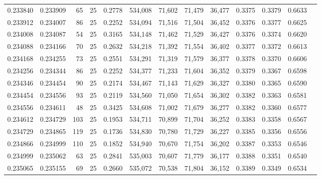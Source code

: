 \begin{tabular}{rrrrrrrrrrrrr}
0.233840 & 0.233909 &    65 &  25 &                                     0.2778 & 534,008 &  71,602 &  71,479 &  36,477 & 0.3375 & 0.3379 & 0.6633 \\
0.233912 & 0.234007 &    86 &  25 &                                     0.2252 & 534,094 &  71,516 &  71,504 &  36,452 & 0.3376 & 0.3377 & 0.6625 \\
0.234008 & 0.234087 &    54 &  25 &                                     0.3165 & 534,148 &  71,462 &  71,529 &  36,427 & 0.3376 & 0.3374 & 0.6620 \\
0.234088 & 0.234166 &    70 &  25 &                                     0.2632 & 534,218 &  71,392 &  71,554 &  36,402 & 0.3377 & 0.3372 & 0.6613 \\
0.234168 & 0.234255 &    73 &  25 &                                     0.2551 & 534,291 &  71,319 &  71,579 &  36,377 & 0.3378 & 0.3370 & 0.6606 \\
0.234256 & 0.234344 &    86 &  25 &                                     0.2252 & 534,377 &  71,233 &  71,604 &  36,352 & 0.3379 & 0.3367 & 0.6598 \\
0.234346 & 0.234454 &    90 &  25 &                                     0.2174 & 534,467 &  71,143 &  71,629 &  36,327 & 0.3380 & 0.3365 & 0.6590 \\
0.234454 & 0.234556 &    93 &  25 &                                     0.2119 & 534,560 &  71,050 &  71,654 &  36,302 & 0.3382 & 0.3363 & 0.6581 \\
0.234556 & 0.234611 &    48 &  25 &                                     0.3425 & 534,608 &  71,002 &  71,679 &  36,277 & 0.3382 & 0.3360 & 0.6577 \\
0.234612 & 0.234729 &   103 &  25 &                                     0.1953 & 534,711 &  70,899 &  71,704 &  36,252 & 0.3383 & 0.3358 & 0.6567 \\
0.234729 & 0.234865 &   119 &  25 &                                     0.1736 & 534,830 &  70,780 &  71,729 &  36,227 & 0.3385 & 0.3356 & 0.6556 \\
0.234866 & 0.234999 &   110 &  25 &                                     0.1852 & 534,940 &  70,670 &  71,754 &  36,202 & 0.3387 & 0.3353 & 0.6546 \\
0.234999 & 0.235062 &    63 &  25 &                                     0.2841 & 535,003 &  70,607 &  71,779 &  36,177 & 0.3388 & 0.3351 & 0.6540 \\
0.235065 & 0.235155 &    69 &  25 &                                     0.2660 & 535,072 &  70,538 &  71,804 &  36,152 & 0.3389 & 0.3349 & 0.6534 \\

\end{tabular}
